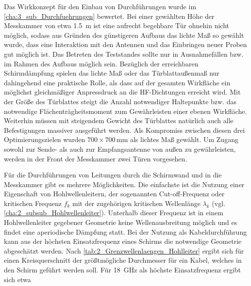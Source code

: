 \par
\vspace{\linespace} 
Das Wirkkonzept für den Einbau von Durchführungen wurde im \Abschnitt\ref{cha:3_sub_Durchfuehrungen} bewertet. Bei einer gewählten Höhe der Messkammer von etwa \SI{1,5}{\meter} ist eine aufrecht begehbare Tür ohnehin nicht möglich, sodass aus Gründen des günstigeren Aufbaus das lichte Maß so gewählt wurde, dass eine Interaktion mit den Antennen und das Einbringen neuer Proben gut möglich ist. Das Betreten des Teststandes sollte nur in Ausnahmefällen bzw. im Rahmen des Aufbaus möglich sein. Bezüglich der erreichbaren Schirmdämpfung spielen das lichte Maß oder das Türblattaußenmaß nur dahingehend eine praktische Rolle, als dass auf der gesamten Wirkfläche ein möglichst gleichmäßiger Anpressdruck an die HF-Dichtungen erreicht wird. Mit der Größe des Türblattes steigt die Anzahl notwendiger Haltepunkte bzw. das notwendige Flächenträgheitsmoment zum Gewährleisten einer ebenen Wirkfläche. Weiterhin müssen mit steigendem Gewicht des Türblattes natürlich auch alle Befestigungen massiver ausgeführt werden. Als Kompromiss zwischen diesen drei Optimierungszielen wurden $700 \times 700\,\si{\milli\meter}$ als lichtes Maß gewählt. Um Zugang sowohl zur Sende- als auch zur Empfangsantenne von außen zu gewährleisten, werden in der Front der Messkammer zwei Türen vorgesehen.
\par
\vspace{\linespace}
Für die Durchführungen von Leitungen durch die Schirmwand und in die Messkammer gibt es mehrere Möglichkeiten. Die einfachste ist die Nutzung einer Eigenschaft von Hohlwellenleitern, der sogenannten Cut-off-Frequenz oder kritischen Frequenz $f_k$ mit der zugehörigen kritischen Wellenlänge $\lambda_k$ (vgl. \Abschnitt\ref{cha:2_subsub_Hohlwellenleiter}). Unterhalb dieser Frequenz ist in einem Hohlwellenleiter gegebener Geometrie \mbox{keine} Wellenausbreitung möglich und es findet eine aperiodische Dämpfung statt. Bei der Nutzung als \mbox{Kabeldurchführung} kann aus der höchsten Einsatzfrequenz eines Schirms die notwendige Geometrie abgeschätzt werden. Nach \Tabelle\ref{tab:2_Grenzwellenlaengen_Hohlleiter} ergibt sich für einen Kreisquerschnitt der größtmögliche Durchmesser für ein Kabel, welches in den Schirm geführt werden soll. Für \SI{18}{\giga\hertz} als höchste Einsatzfrequenz ergibt sich etwa

